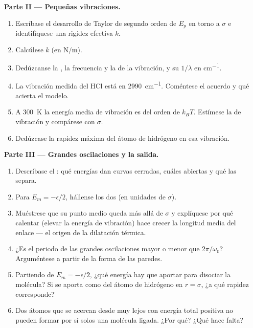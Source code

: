 \begin{problem}
\medskip
\noindent\textbf{Parte II --- Pequeñas vibraciones.}
\begin{enumerate}[resume]
  \item Escríbase el desarrollo de Taylor de segundo orden de $E_p$ en
        torno a $\sigma$ e identifíquese una rigidez efectiva $k$.
  \item Calcúlese $k$ (en \unit{N/m}).
  \item Dedúzcanse la , la frecuencia y la  de la vibración, y su  $1/\lambda$ en \unit{cm^{-1}}.
  \item La vibración medida del HCl está en \qty{2990}{cm^{-1}}. Coméntese
        el acuerdo y qué acierta el modelo.
  \item A \qty{300}{K} la energía media de vibración es del orden de
        $k_BT$. Estímese la  de vibración y compárese con $\sigma$.
  \item Dedúzcase la rapidez máxima del átomo de hidrógeno en esa
        vibración.
\end{enumerate}

\medskip
\noindent\textbf{Parte III --- Grandes oscilaciones y la salida.}
\begin{enumerate}[resume]
  \item Descríbase el : qué energías dan curvas cerradas,
        cuáles abiertas y qué las separa.
  \item Para $E_m = -\epsilon/2$, hállense los dos  (en
        unidades de $\sigma$).
  \item Muéstrese que su punto medio queda más allá de $\sigma$ y
        explíquese por qué calentar (elevar la energía de vibración) hace
        crecer la longitud media del enlace --- el origen de la dilatación
        térmica.
  \item ¿Es el periodo de las grandes oscilaciones mayor o menor que
        $2\pi/\omega_0$? Arguméntese a partir de la forma de las paredes.
  \item Partiendo de $E_m = -\epsilon/2$, ¿qué energía hay que aportar
        para disociar la molécula? Si se aporta como  del
        átomo de hidrógeno en $r = \sigma$, ¿a qué rapidez corresponde?
  \item Dos átomos que se acercan desde muy lejos con energía total
        positiva no pueden formar por sí solos una molécula ligada. ¿Por
        qué? ¿Qué hace falta?
\end{enumerate}


\end{problem}

